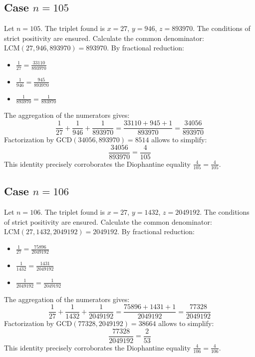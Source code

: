 \documentclass[11pt,a4paper]{article}
\begin{document}
\subsection{Case $n = 105$}
Let $n = 105$. The triplet found is $x = 27$, $y = 946$, $z = 893970$.
The conditions of strict positivity are ensured.
Calculate the common denominator: $\text{LCM}(27, 946, 893970) = 893970$.
By fractional reduction:
\begin{itemize}
    \item $\frac{1}{27} = \frac{33110}{893970}$
    \item $\frac{1}{946} = \frac{945}{893970}$
    \item $\frac{1}{893970} = \frac{1}{893970}$
\end{itemize}
The aggregation of the numerators gives:
$$ \frac{1}{27} + \frac{1}{946} + \frac{1}{893970} = \frac{33110 + 945 + 1}{893970} = \frac{34056}{893970} $$
Factorization by $\text{GCD}(34056, 893970) = 8514$ allows to simplify:
$$ \frac{34056}{893970} = \frac{4}{105} $$
This identity precisely corroborates the Diophantine equality $\frac{4}{105} = \frac{4}{105}$.

\subsection{Case $n = 106$}
Let $n = 106$. The triplet found is $x = 27$, $y = 1432$, $z = 2049192$.
The conditions of strict positivity are ensured.
Calculate the common denominator: $\text{LCM}(27, 1432, 2049192) = 2049192$.
By fractional reduction:
\begin{itemize}
    \item $\frac{1}{27} = \frac{75896}{2049192}$
    \item $\frac{1}{1432} = \frac{1431}{2049192}$
    \item $\frac{1}{2049192} = \frac{1}{2049192}$
\end{itemize}
The aggregation of the numerators gives:
$$ \frac{1}{27} + \frac{1}{1432} + \frac{1}{2049192} = \frac{75896 + 1431 + 1}{2049192} = \frac{77328}{2049192} $$
Factorization by $\text{GCD}(77328, 2049192) = 38664$ allows to simplify:
$$ \frac{77328}{2049192} = \frac{2}{53} $$
This identity precisely corroborates the Diophantine equality $\frac{4}{106} = \frac{4}{106}$.
\end{document}
